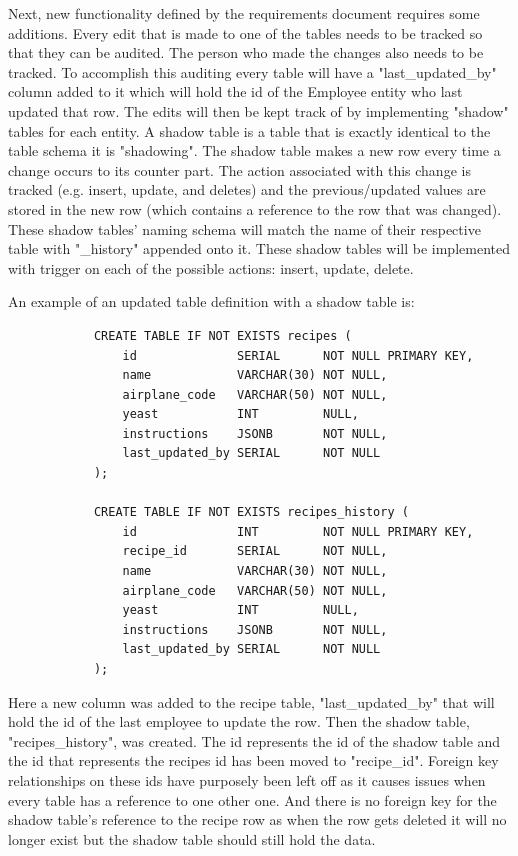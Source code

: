 \documentclass[draftclsnofoot,onecolumn,journal,letterpaper,compsoc,10pt]{IEEEtran}
\begin{document}
        Next, new functionality defined by the requirements document requires some additions.  Every edit that is made to one of the tables needs to be tracked so that they can be audited.  The person who made the changes also needs to be tracked.  To accomplish this auditing every table will have a "last\_updated\_by" column added to it which will hold the id of the Employee entity who last updated that row.  The edits will then be kept track of by implementing "shadow" tables for each entity.  A shadow table is a table that is exactly identical to the table schema it is "shadowing".  The shadow table makes a new row every time a change occurs to its counter part.  The action associated with this change is tracked (e.g. insert, update, and deletes) and the previous/updated values are stored in the new row (which contains a reference to the row that was changed).  These shadow tables' naming schema will match the name of their respective table with "\_history" appended onto it.  These shadow tables will be implemented with trigger on each of the possible actions: insert, update, delete.
        
        An example of an updated table definition with a shadow table is:\\
        
        \begin{verbatim}
            CREATE TABLE IF NOT EXISTS recipes (
                id              SERIAL      NOT NULL PRIMARY KEY,
                name            VARCHAR(30) NOT NULL,
                airplane_code   VARCHAR(50) NOT NULL,
                yeast           INT         NULL,
                instructions    JSONB       NOT NULL,
                last_updated_by SERIAL      NOT NULL
            );
            
            CREATE TABLE IF NOT EXISTS recipes_history (
                id              INT         NOT NULL PRIMARY KEY,
                recipe_id       SERIAL      NOT NULL,
                name            VARCHAR(30) NOT NULL,
                airplane_code   VARCHAR(50) NOT NULL,
                yeast           INT         NULL,
                instructions    JSONB       NOT NULL,
                last_updated_by SERIAL      NOT NULL
            );
        \end{verbatim} 
    
        Here a new column was added to the recipe table, "last\_updated\_by" that will hold the id of the last employee to update the row.  Then the shadow table, "recipes\_history", was created.  The id represents the id of the shadow table and the id that represents the recipes id has been moved to "recipe\_id".  Foreign key relationships on these ids have purposely been left off as it causes issues when every table has a reference to one other one.  And there is no foreign key for the shadow table's reference to the recipe row as when the row gets deleted it will no longer exist but the shadow table should still hold the data.
    
\end{document}
